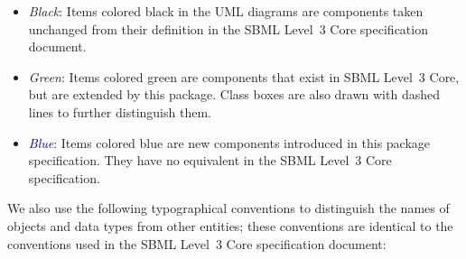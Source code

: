 \documentclass[draftspec]{sbmlpkgspec}
\begin{document}
\begin{itemize}

\item[\raisebox{2.75pt}{\colorbox{black}{\rule{0.8pt}{0.8pt}}}]
  \emph{Black}: Items colored black in the UML diagrams are components
  taken unchanged from their definition in the SBML Level~3 Core
  specification document.

\item[\raisebox{2.75pt}{\colorbox{mediumgreen}{\rule{0.8pt}{0.8pt}}}]
  \emph{\textcolor{mediumgreen}{Green}}: Items colored green are
  components that exist in SBML Level~3 Core, but are extended by this
  package.  Class boxes are also drawn with dashed lines to further
  distinguish them.

\item[\raisebox{2.75pt}{\colorbox{darkblue}{\rule{0.8pt}{0.8pt}}}]
  \emph{\textcolor{darkblue}{Blue}}: Items colored blue are new
  components introduced in this package specification.  They have no
  equivalent in the SBML Level~3 Core specification.

\end{itemize}

We also use the following typographical conventions to distinguish the
names of objects and data types from other entities; these conventions
are identical to the conventions used in the SBML Level~3 Core specification
document:
\end{document}
